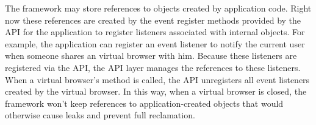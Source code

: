 The framework may store references to objects created by application
code.  Right now these references are created by the event register methods
provided by the API for the application to register listeners associated with internal
objects. For example, the application can register an event listener to notify
the current user when someone shares an virtual browser with him.  Because these
listeners are registered via the API, the API layer manages the references to these
listeners. When a virtual browser's  method is called, the API
unregisters all event listeners created by the virtual browser. In this
way, when a virtual browser is closed, the framework won't keep references
to application-created objects that would otherwise cause leaks and prevent
full reclamation.


